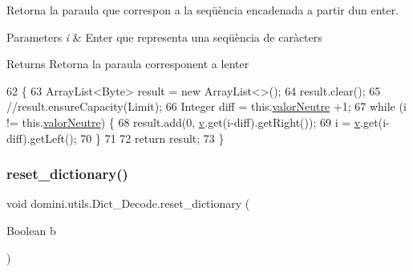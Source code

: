 Retorna la paraula que correspon a la seqüència encadenada a partir d\textquotesingle{}un enter. 


\begin{DoxyParams}{Parameters}
{\em i} & Enter que representa una seqüència de caràcters \\
\hline
\end{DoxyParams}
\begin{DoxyReturn}{Returns}
Retorna la paraula corresponent a l\textquotesingle{}enter 
\end{DoxyReturn}

\begin{DoxyCode}
62                                               \{
63         ArrayList<Byte> result = \textcolor{keyword}{new} ArrayList<>();
64         result.clear();
65         \textcolor{comment}{//result.ensureCapacity(Limit);}
66         Integer diff = this.\hyperlink{classdomini_1_1utils_1_1Dict__Decode_a6ef2d17f449cf7a658a4bf983e2fb474}{valorNeutre} +1;
67         \textcolor{keywordflow}{while} (i != this.\hyperlink{classdomini_1_1utils_1_1Dict__Decode_a6ef2d17f449cf7a658a4bf983e2fb474}{valorNeutre}) \{
68             result.add(0, \hyperlink{classdomini_1_1utils_1_1Dict__Decode_a351bb8836b391e5e21ebc9cc1943a22d}{v}.get(i-diff).getRight());
69             i = \hyperlink{classdomini_1_1utils_1_1Dict__Decode_a351bb8836b391e5e21ebc9cc1943a22d}{v}.get(i-diff).getLeft();
70         \}
71 
72         \textcolor{keywordflow}{return} result;
73     \}
\end{DoxyCode}
\mbox{\label{classdomini_1_1utils_1_1Dict__Decode_a635432505df1ceaa58a987bb80c6b0a3}} 
\subsubsection{\texorpdfstring{reset\+\_\+dictionary()}{reset\_dictionary()}}
{\footnotesize\ttfamily void domini.\+utils.\+Dict\+\_\+\+Decode.\+reset\+\_\+dictionary (\begin{DoxyParamCaption}\item[{Boolean}]{b }\end{DoxyParamCaption})\hspace{0.3cm}{\ttfamily [inline]}}



